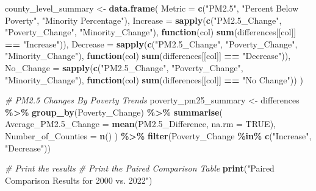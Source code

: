 \documentclass[
]{article}
\newenvironment{Shaded}{\begin{snugshade}}{\end{snugshade}}
\newcommand{\AttributeTok}[1]{\textcolor[rgb]{0.13,0.29,0.53}{#1}}
\newcommand{\CommentTok}[1]{\textcolor[rgb]{0.56,0.35,0.01}{\textit{#1}}}
\newcommand{\ConstantTok}[1]{\textcolor[rgb]{0.56,0.35,0.01}{#1}}
\newcommand{\ControlFlowTok}[1]{\textcolor[rgb]{0.13,0.29,0.53}{\textbf{#1}}}
\newcommand{\FloatTok}[1]{\textcolor[rgb]{0.00,0.00,0.81}{#1}}
\newcommand{\FunctionTok}[1]{\textcolor[rgb]{0.13,0.29,0.53}{\textbf{#1}}}
\newcommand{\NormalTok}[1]{#1}
\newcommand{\OtherTok}[1]{\textcolor[rgb]{0.56,0.35,0.01}{#1}}
\newcommand{\SpecialCharTok}[1]{\textcolor[rgb]{0.81,0.36,0.00}{\textbf{#1}}}
\newcommand{\StringTok}[1]{\textcolor[rgb]{0.31,0.60,0.02}{#1}}
\begin{document}
\begin{Shaded}
\begin{Highlighting}[]
\NormalTok{county\_level\_summary }\OtherTok{\textless{}{-}} \FunctionTok{data.frame}\NormalTok{(}
  \AttributeTok{Metric =} \FunctionTok{c}\NormalTok{(}\StringTok{"PM2.5"}\NormalTok{, }\StringTok{"Percent Below Poverty"}\NormalTok{, }\StringTok{"Minority Percentage"}\NormalTok{),}
  \AttributeTok{Increase =} \FunctionTok{sapply}\NormalTok{(}\FunctionTok{c}\NormalTok{(}\StringTok{"PM2.5\_Change"}\NormalTok{, }\StringTok{"Poverty\_Change"}\NormalTok{, }\StringTok{"Minority\_Change"}\NormalTok{), }
                    \ControlFlowTok{function}\NormalTok{(col) }\FunctionTok{sum}\NormalTok{(differences[[col]] }\SpecialCharTok{==} \StringTok{"Increase"}\NormalTok{)),}
  \AttributeTok{Decrease =} \FunctionTok{sapply}\NormalTok{(}\FunctionTok{c}\NormalTok{(}\StringTok{"PM2.5\_Change"}\NormalTok{, }\StringTok{"Poverty\_Change"}\NormalTok{, }\StringTok{"Minority\_Change"}\NormalTok{), }
                    \ControlFlowTok{function}\NormalTok{(col) }\FunctionTok{sum}\NormalTok{(differences[[col]] }\SpecialCharTok{==} \StringTok{"Decrease"}\NormalTok{)),}
  \AttributeTok{No\_Change =} \FunctionTok{sapply}\NormalTok{(}\FunctionTok{c}\NormalTok{(}\StringTok{"PM2.5\_Change"}\NormalTok{, }\StringTok{"Poverty\_Change"}\NormalTok{, }\StringTok{"Minority\_Change"}\NormalTok{), }
                     \ControlFlowTok{function}\NormalTok{(col) }\FunctionTok{sum}\NormalTok{(differences[[col]] }\SpecialCharTok{==} \StringTok{"No Change"}\NormalTok{))}
\NormalTok{)}

\CommentTok{\# PM2.5 Changes By Poverty Trends}
\NormalTok{poverty\_pm25\_summary }\OtherTok{\textless{}{-}}\NormalTok{ differences }\SpecialCharTok{\%\textgreater{}\%}
  \FunctionTok{group\_by}\NormalTok{(Poverty\_Change) }\SpecialCharTok{\%\textgreater{}\%}
  \FunctionTok{summarise}\NormalTok{(}
    \AttributeTok{Average\_PM2.5\_Change =} \FunctionTok{mean}\NormalTok{(PM2}\FloatTok{.5}\NormalTok{\_Difference, }\AttributeTok{na.rm =} \ConstantTok{TRUE}\NormalTok{),}
    \AttributeTok{Number\_of\_Counties =} \FunctionTok{n}\NormalTok{()}
\NormalTok{  ) }\SpecialCharTok{\%\textgreater{}\%}
  \FunctionTok{filter}\NormalTok{(Poverty\_Change }\SpecialCharTok{\%in\%} \FunctionTok{c}\NormalTok{(}\StringTok{"Increase"}\NormalTok{, }\StringTok{"Decrease"}\NormalTok{))}


\CommentTok{\# Print the results}
\CommentTok{\# Print the Paired Comparison Table}
\FunctionTok{print}\NormalTok{(}\StringTok{"Paired Comparison Results for 2000 vs. 2022"}\NormalTok{)}
\end{Highlighting}
\end{Shaded}
\end{document}
